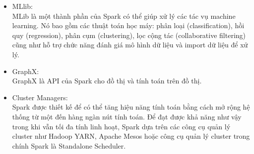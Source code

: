 \documentclass[11pt,a4paper]{article}
\begin{document}
\begin{itemize}
    \item MLlib:\\
    MLib là một thành phần của Spark có thể giúp xử lý các tác vụ machine learning. Nó bao gồm các thuật toán học máy: phân loại (classification), hồi quy (regression), phân cụm (clustering), lọc cộng tác (collaborative filtering) cũng như hỗ trợ chức năng đánh giá mô hình dữ liệu và import dữ liệu để xử lý. 
    \item GraphX:\\
    GraphX là API của Spark cho đồ thị và tính toán trên đồ thị.
    \item Cluster Managers:\\
    Spark được thiết kế để có thể tăng hiệu năng tính toán bằng cách mở rộng hệ thống từ một đến hàng ngàn nút tính toán. Để đạt được khả năng như vậy trong khi vẫn tối đa tính linh hoạt, Spark dựa trên các công cụ quản lý cluster như Hadoop YARN, Apache Mesos hoặc công cụ quản lý cluster trong chính Spark là Standalone Scheduler. 
\end{itemize}
\newpage
\end{document}
